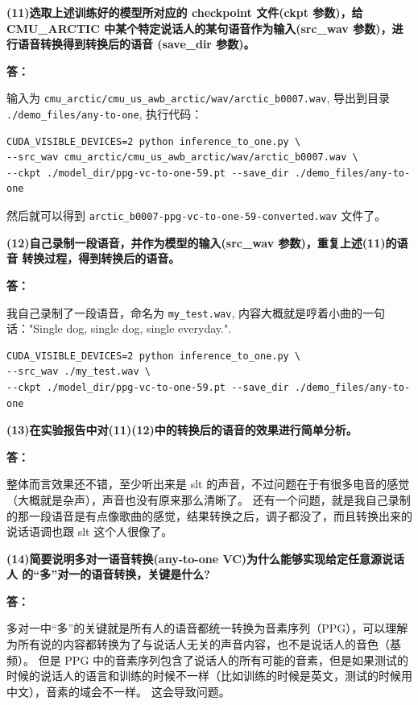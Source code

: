 \documentclass[degree=project,degree-type=project,cjk-font=noto]{thuthesis}
\begin{document}
\textbf{(11)选取上述训练好的模型所对应的 checkpoint 文件(ckpt 参数)，给 CMU\_ARCTIC 中某个特定说话人的某句语音作为输入(src\_wav 参数)，进行语音转换得到转换后的语音 (save\_dir 参数)。}

\textbf{答：}

输入为 \texttt{cmu\_arctic/cmu\_us\_awb\_arctic/wav/arctic\_b0007.wav}, 导出到目录 \texttt{./demo\_files/any-to-one}, 执行代码：

  \begin{verbatim}
CUDA_VISIBLE_DEVICES=2 python inference_to_one.py \
--src_wav cmu_arctic/cmu_us_awb_arctic/wav/arctic_b0007.wav \
--ckpt ./model_dir/ppg-vc-to-one-59.pt --save_dir ./demo_files/any-to-one
\end{verbatim}

然后就可以得到 \texttt{arctic\_b0007-ppg-vc-to-one-59-converted.wav} 文件了。

\textbf{(12)自己录制一段语音，并作为模型的输入(src\_wav 参数)，重复上述(11)的语音 转换过程，得到转换后的语音。}

\textbf{答：}

我自己录制了一段语音，命名为 \texttt{my\_test.wav}, 内容大概就是哼着小曲的一句话："Single dog, single dog, single everyday.".

  \begin{verbatim}
CUDA_VISIBLE_DEVICES=2 python inference_to_one.py \
--src_wav ./my_test.wav \
--ckpt ./model_dir/ppg-vc-to-one-59.pt --save_dir ./demo_files/any-to-one
\end{verbatim}

\textbf{(13)在实验报告中对(11)(12)中的转换后的语音的效果进行简单分析。}

\textbf{答：}

整体而言效果还不错，至少听出来是 slt 的声音，不过问题在于有很多电音的感觉（大概就是杂声），声音也没有原来那么清晰了。
还有一个问题，就是我自己录制的那一段语音是有点像歌曲的感觉，结果转换之后，调子都没了，而且转换出来的说话语调也跟 slt 这个人很像了。

\textbf{(14)简要说明多对一语音转换(any-to-one VC)为什么能够实现给定任意源说话人 的“多”对一的语音转换，关键是什么?}

\textbf{答：}

多对一中“多”的关键就是所有人的语音都统一转换为音素序列（PPG），可以理解为所有说的内容都转换为了与说话人无关的声音内容，也不是说话人的音色（基频）。
但是 PPG 中的音素序列包含了说话人的所有可能的音素，但是如果测试的时候的说话人的语言和训练的时候不一样（比如训练的时候是英文，测试的时候用中文），音素的域会不一样。
这会导致问题。
\end{document}
